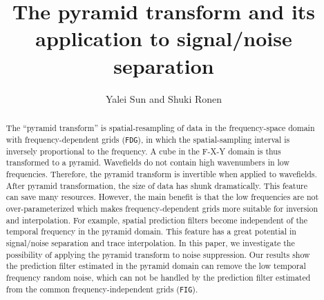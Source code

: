 
\def\figdir{./Fig}
\title{The pyramid transform and its application to signal/noise separation}
\author{Yalei Sun and Shuki Ronen}

\begin{abstract}
The ``pyramid transform'' is spatial-resampling of data in the
frequency-space domain with frequency-dependent grids ({\tt FDG}), in which
the spatial-sampling interval is inversely proportional to the frequency.
A cube in the F-X-Y domain is thus transformed to a pyramid.
Wavefields do not contain high wavenumbers in low frequencies.
Therefore, the pyramid transform is invertible when applied to wavefields.
After pyramid transformation, the size of data has shunk dramatically.
This feature can save many resources. However, the main benefit is that the low
frequencies are not over-parameterized which makes frequency-dependent
grids more suitable for inversion and interpolation.
For example, spatial prediction filters become independent of the temporal
frequency in the pyramid domain.  This feature has a great
potential in signal/noise separation and trace interpolation.
In this paper, we investigate the possibility of applying the pyramid 
transform to noise suppression. Our results
show the prediction filter estimated in the pyramid domain can remove the
low temporal frequency random noise, which can not be handled by the
prediction filter estimated from the common frequency-independent grids 
({\tt FIG}). 
\end{abstract}

  
